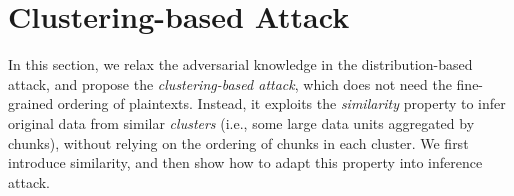 \documentclass[bachelor]{thesis-uestc}
\begin{document}






\chapter{Clustering-based Attack}
\label{sec:clustering-attack}


In this section, we relax the adversarial knowledge in the distribution-based attack, and propose the {\em clustering-based attack}, which does not need the fine-grained ordering of plaintexts. Instead, it exploits the {\em similarity} property to infer original data from similar {\em clusters} (i.e., some large data units aggregated by chunks), without relying on the ordering of chunks in each cluster. We first introduce similarity, and then show how to adapt this property into inference attack. 



\end{document}
